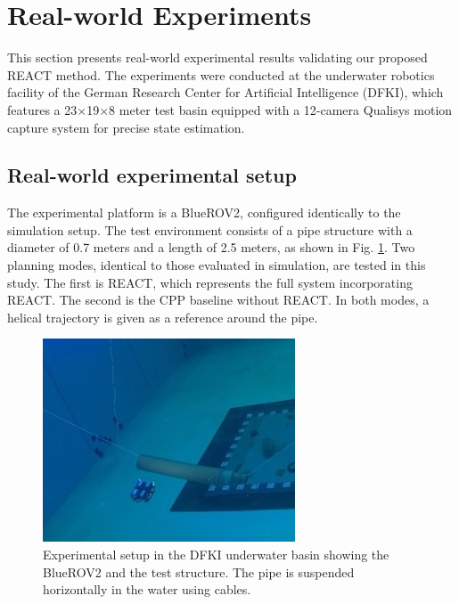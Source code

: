 \section{Real-world Experiments}
\label{sec:real-world}


This section presents real-world experimental results validating our proposed \ac{REACT} method. The experiments were conducted at the underwater robotics facility of the German Research Center for Artificial Intelligence (DFKI), which features a 23$\times$19$\times$8 meter test basin equipped with a 12-camera Qualisys motion capture system for precise state estimation. 

\subsection{Real-world  experimental setup}
The experimental platform is a BlueROV2, configured identically to the simulation setup. The test environment consists of a pipe structure with a diameter of 0.7 meters and a length of 2.5 meters, as shown in Fig. \ref{fig:pipe}. Two planning modes, identical to those evaluated in simulation, are tested in this study. The first is \ac{REACT}, which represents the full system incorporating \ac{REACT}. The second is the \ac{CPP} baseline without \ac{REACT}. In both modes, a helical trajectory is given as a reference around the pipe.





\begin{figure}[ht]
    \centering
    \includegraphics[width=0.85\linewidth]{EA-Planner/figures/dfki_pipe.jpeg}
    \caption{ Experimental setup in the DFKI underwater basin showing the BlueROV2 and the test structure. The pipe is suspended horizontally in the water using cables.}
    \label{fig:pipe}
\end{figure}

